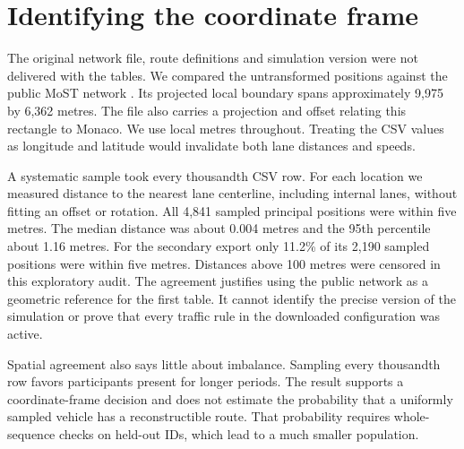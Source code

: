 
\section{Identifying the coordinate frame}
The original network file, route definitions and simulation version were not delivered with the tables. We compared the untransformed positions against the public MoST network \cite{most}. Its projected local boundary spans approximately 9,975 by 6,362 metres. The file also carries a projection and offset relating this rectangle to Monaco. We use local metres throughout. Treating the CSV values as longitude and latitude would invalidate both lane distances and speeds.

A systematic sample took every thousandth CSV row. For each location we measured distance to the nearest lane centerline, including internal lanes, without fitting an offset or rotation. All 4,841 sampled principal positions were within five metres. The median distance was about 0.004 metres and the 95th percentile about 1.16 metres. For the secondary export only 11.2\% of its 2,190 sampled positions were within five metres. Distances above 100 metres were censored in this exploratory audit. The agreement justifies using the public network as a geometric reference for the first table. It cannot identify the precise version of the simulation or prove that every traffic rule in the downloaded configuration was active.

Spatial agreement also says little about imbalance. Sampling every thousandth row favors participants present for longer periods. The result supports a coordinate-frame decision and does not estimate the probability that a uniformly sampled vehicle has a reconstructible route. That probability requires whole-sequence checks on held-out IDs, which lead to a much smaller population.

